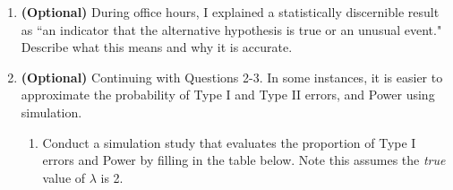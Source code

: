 \documentclass{article}\usepackage[]{graphicx}\usepackage[]{xcolor}
\begin{document}
\begin{enumerate}
  In a loop, generate an observation from the Binomial($n=15$, $p=0.10$) 
  distribution and compute the Pearson Clopper interval and the Wilson interval
  ten thousand times.
  \begin{enumerate}
    \item What proportion of the time is the true proportion in the Pearson 
    Clopper interval? The Wilson interval?
    \item Consider $n=1000$ and $p=0.10$. What proportion of the time is the true 
    proportion in the Pearson Clopper interval? The Wilson interval?
    \item Consider $n=15$ and $p=0.50$. What proportion of the time is the true 
    proportion in the Pearson Clopper interval? The Wilson interval?
    \item Consider $n=5$ and $p=0.50$. What proportion of the time is the true 
    proportion in the Pearson Clopper interval? The Wilson interval?
    \item What do parts (a)-(d) tell us about when to use each approach?
  \end{enumerate}
  \item \textbf{(Optional)} During office hours, I explained a statistically 
  discernible result as ``an indicator that the alternative hypothesis is true
  or an unusual event." Describe what this means and why it is accurate.
  \item \textbf{(Optional)} Continuing with Questions 2-3.
  In some instances, it is easier to approximate the 
  probability of Type I and Type II errors, and Power using simulation. 
  \begin{enumerate}
    \item Conduct a simulation study that evaluates the proportion of Type I 
    errors and Power by filling in the table below. Note this assumes the 
    \emph{true} value of $\lambda$ is 2.\\

\end{enumerate}
\end{enumerate}
\end{document}
